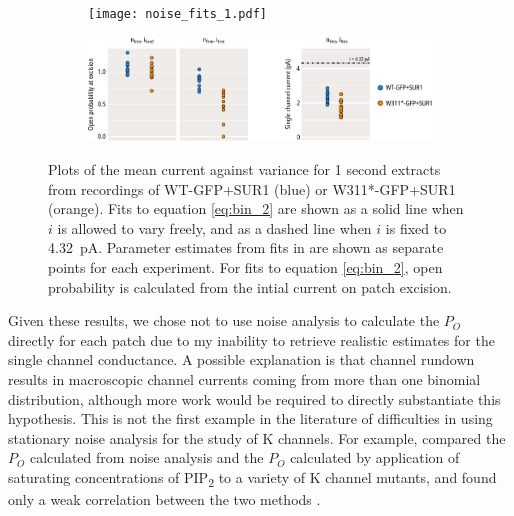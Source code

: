 \begin{figure}[hbtp]
	\centering
	\begin{subfigure}[t]{0.9\textwidth}
		\caption{}\label{ch4fig:noise_fits_1}
		\centering
		\texttt{[image: noise\_fits\_1.pdf]}
	\end{subfigure}
	\vfill
	\begin{subfigure}[t]{0.9\textwidth}
		\caption{}\label{ch4fig:noise_fits_2}
		\centering
		\includegraphics[width=\textwidth]{noise_fits_2.pdf}
	\end{subfigure}
	\caption[Estimating open probability from stationary noise analysis]{
	{\bf{}}
	 Plots of the mean current against variance for 1 second extracts from recordings of WT-GFP+SUR1 (blue) or W311*-GFP+SUR1 (orange).
	Fits to equation \ref{eq:bin_2} are shown as a solid line when $i$ is allowed to vary freely, and as a dashed line when $i$ is fixed to \SI{4.32}{\pico\ampere}.
	 Parameter estimates from fits in  are shown as separate points for each experiment.
	For fits to equation \ref{eq:bin_2}, open probability is calculated from the intial current on patch excision.
	}\label{ch4fig:all_noise_fits}
\end{figure}

Given these results, we chose not to use noise analysis to calculate the $P_O$ directly for each patch due to my inability to retrieve realistic estimates for the single channel conductance.
A possible explanation is that channel rundown results in macroscopic channel currents coming from more than one binomial distribution, although more work would be required to directly substantiate this hypothesis.
This is not the first example in the literature of difficulties in using stationary noise analysis for the study of K\ATP{} channels.
For example, \textcite{cukras_role_2002} compared the $P_O$ calculated from noise analysis and the $P_O$ calculated by application of saturating concentrations of PIP\textsubscript{2} to a variety of K\ATP{} channel mutants, and found only a weak correlation between the two methods \cite{cukras_role_2002}.


